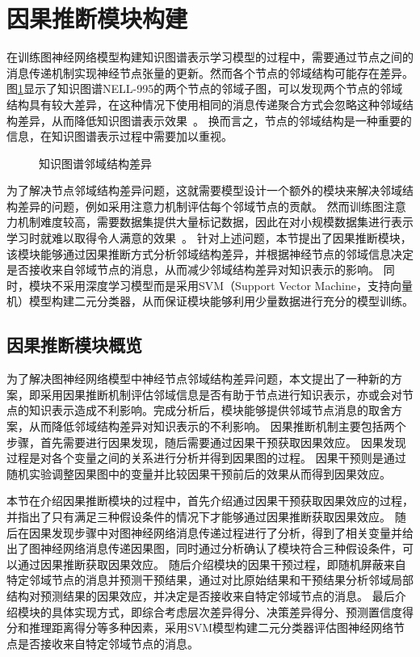 \documentclass[algorithmlist, AutoFakeBold, AutoFakeSlant, figurelist, tablelist, nomlist, engineering]{seuthesix}
\begin{document}
\section{因果推断模块构建}
在训练图神经网络模型构建知识图谱表示学习模型的过程中，需要通过节点之间的消息传递机制实现神经节点张量的更新。然而各个节点的邻域结构可能存在差异。
图\ref{2_LocalStructure}显示了知识图谱NELL-995的两个节点的邻域子图，可以发现两个节点的邻域结构具有较大差异，在这种情况下使用相同的消息传递聚合方式会忽略这种邻域结构差异，从而降低知识图谱表示效果~\cite{chen2020measuring}。
换而言之，节点的邻域结构是一种重要的信息，在知识图谱表示过程中需要加以重视。
\begin{figure}
  \centering
  \caption{知识图谱邻域结构差异}
  \label{2_LocalStructure}
\end{figure}
为了解决节点邻域结构差异问题，这就需要模型设计一个额外的模块来解决邻域结构差异的问题，例如采用注意力机制评估每个邻域节点的贡献。
然而训练图注意力机制难度较高，需要数据集提供大量标记数据，因此在对小规模数据集进行表示学习时就难以取得令人满意的效果~\cite{knyazev2019understanding}。
针对上述问题，本节提出了因果推断模块，该模块能够通过因果推断方式分析邻域结构差异，并根据神经节点的邻域信息决定是否接收来自邻域节点的消息，从而减少邻域结构差异对知识表示的影响。
同时，模块不采用深度学习模型而是采用SVM（Support Vector Machine，支持向量机）模型构建二元分类器，从而保证模块能够利用少量数据进行充分的模型训练。

\subsection{因果推断模块概览}
为了解决图神经网络模型中神经节点邻域结构差异问题，本文提出了一种新的方案，即采用因果推断机制评估邻域信息是否有助于节点进行知识表示，亦或会对节点的知识表示造成不利影响。完成分析后，模块能够提供邻域节点消息的取舍方案，从而降低邻域结构差异对知识表示的不利影响。
因果推断机制主要包括两个步骤，首先需要进行因果发现，随后需要通过因果干预获取因果效应。
因果发现过程是对各个变量之间的关系进行分析并得到因果图的过程。
因果干预则是通过随机实验调整因果图中的变量并比较因果干预前后的效果从而得到因果效应。

本节在介绍因果推断模块的过程中，首先介绍通过因果干预获取因果效应的过程，并指出了只有满足三种假设条件的情况下才能够通过因果推断获取因果效应。
随后在因果发现步骤中对图神经网络消息传递过程进行了分析，得到了相关变量并给出了图神经网络消息传递因果图，同时通过分析确认了模块符合三种假设条件，可以通过因果推断获取因果效应。
随后介绍模块的因果干预过程，即随机屏蔽来自特定邻域节点的消息并预测干预结果，通过对比原始结果和干预结果分析邻域局部结构对预测结果的因果效应，并决定是否接收来自特定邻域节点的消息。
最后介绍模块的具体实现方式，即综合考虑层次差异得分、决策差异得分、预测置信度得分和推理距离得分等多种因素，采用SVM模型构建二元分类器评估图神经网络节点是否接收来自特定邻域节点的消息。
\end{document}
